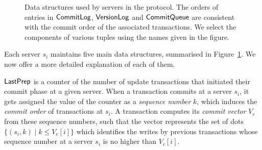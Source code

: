 \begin{figure}[t]
\noindent{}
\caption{
  Data structures used by servers in the protocol. The orders of entries in $\mathsf{CommitLog}$, $\mathsf{VersionLog}$ and $\mathsf{CommitQueue}$ are consistent with the commit order of the associated transactions. We select the components of various tuples using the names given in the figure.}
\label{fig:server-structures}
\end{figure}

Each server $s_i$ maintains five main data structures, summarised in Figure~\ref{fig:server-structures}. We now offer a more detailed explanation of each of them.

$\mathsf{LastPrep}$ is a counter of the number of update transactions that initiated their commit phase at a given server. When a transaction commits at a server $s_i$, it gets assigned the value of the counter as a \emph{sequence number} $k$, which induces the \emph{commit order} of transactions at $s_i$. A transaction computes its \emph{commit vector} $V_c$ from these sequence numbers, such that the vector represents the set of dots $\{(s_i, k) \mid k \le V_c[i]\}$ which identifies the writes by previous transactions whose sequence number at a server $s_i$ is no higher than $V_c[i]$.

